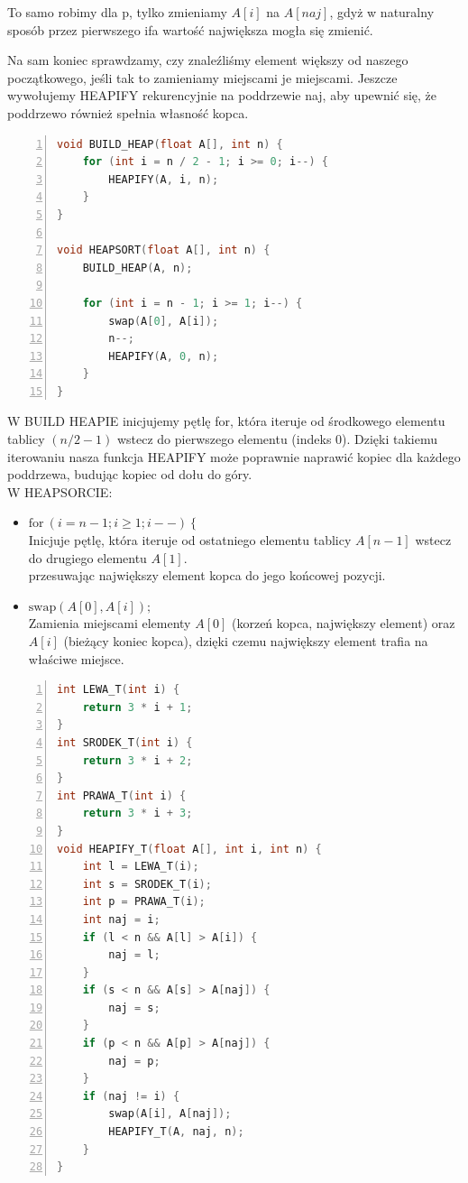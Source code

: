 \documentclass{article}
\begin{document}
\large{To samo robimy dla p, tylko zmieniamy \(A[i]\) na \(A[naj]\), gdyż w naturalny sposób przez pierwszego ifa wartość największa mogła się zmienić.}

\large{Na sam koniec sprawdzamy, czy znaleźliśmy element większy od naszego początkowego, jeśli tak to zamieniamy miejscami je miejscami. Jeszcze wywołujemy HEAPIFY rekurencyjnie na poddrzewie naj, aby upewnić się, że poddrzewo również spełnia własność kopca.}
\\
\begin{lstlisting}[language=C++, caption={Fragment 2 funkcji sortującej przez kopcowanie bez modyfikacji}, numbers=left, frame=single, xleftmargin=20pt, xrightmargin = 1pt]
void BUILD_HEAP(float A[], int n) {
	for (int i = n / 2 - 1; i >= 0; i--) {
		HEAPIFY(A, i, n);
	}
}

void HEAPSORT(float A[], int n) {
	BUILD_HEAP(A, n);
	
	for (int i = n - 1; i >= 1; i--) {
		swap(A[0], A[i]);
		n--;
		HEAPIFY(A, 0, n);
	}
}
\end{lstlisting}

\large{W BUILD HEAPIE inicjujemy pętlę for, która iteruje od środkowego elementu tablicy \((n / 2 - 1)\) wstecz do pierwszego elementu (indeks \(0\)). Dzięki takiemu iterowaniu nasza funkcja HEAPIFY może poprawnie naprawić kopiec dla każdego poddrzewa, budując kopiec od dołu do góry.}
\\

\large {W HEAPSORCIE: }

\begin{itemize}
\item $ \text{for} \ (i = n - 1; i \geq 1; i--) \ {\{}$ \\
Inicjuje pętlę, która iteruje od ostatniego elementu tablicy $A[n - 1]$ wstecz do drugiego elementu $A[1]$. \\
przesuwając największy element kopca do jego końcowej pozycji.

\item $ \text{swap}(A[0], A[i]);$ \\
Zamienia miejscami elementy $A[0]$ (korzeń kopca, największy element) oraz $A[i]$ (bieżący koniec kopca), dzięki czemu największy element trafia na właściwe miejsce. 
\end{itemize}

\begin{lstlisting}[language=C++, caption={Fragment 1 funkcji sortującej przez kopcowanie z modyfikacją}, numbers=left, frame=single, xleftmargin=20pt, xrightmargin = 1pt]
int LEWA_T(int i) {
	return 3 * i + 1;
}
int SRODEK_T(int i) {
	return 3 * i + 2;
}
int PRAWA_T(int i) {
	return 3 * i + 3;
}
void HEAPIFY_T(float A[], int i, int n) {
	int l = LEWA_T(i);
	int s = SRODEK_T(i);
	int p = PRAWA_T(i);
	int naj = i;
	if (l < n && A[l] > A[i]) {
		naj = l;
	}
	if (s < n && A[s] > A[naj]) {
		naj = s;
	}
	if (p < n && A[p] > A[naj]) {
		naj = p;
	}
	if (naj != i) {
		swap(A[i], A[naj]);
		HEAPIFY_T(A, naj, n);
	}
}
\end{lstlisting}
\end{document}
